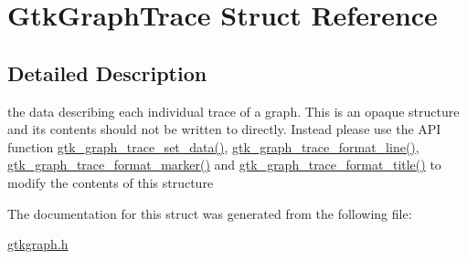\hypertarget{struct_gtk_graph_trace}{
\section{GtkGraphTrace Struct Reference}
\label{struct_gtk_graph_trace}
}


\subsection{Detailed Description}
the data describing each individual trace of a graph. This is an opaque structure and its contents should not be written to directly. Instead please use the API function \hyperlink{gtkgraph_8h_a56bdaf9c2c4612d33a57ca1af2e151c9}{gtk\_\-graph\_\-trace\_\-set\_\-data()}, \hyperlink{gtkgraph_8h_a0006dc30b139c49bfe454eee512c0754}{gtk\_\-graph\_\-trace\_\-format\_\-line()}, \hyperlink{gtkgraph_8h_a6d76b02b2e2db42af55cd3dd8a3df357}{gtk\_\-graph\_\-trace\_\-format\_\-marker()} and \hyperlink{gtkgraph_8h_ad81fd5d72e63d30a708d05707a657996}{gtk\_\-graph\_\-trace\_\-format\_\-title()} to modify the contents of this structure 

The documentation for this struct was generated from the following file:\begin{DoxyCompactItemize}
\item 
\hyperlink{gtkgraph_8h}{gtkgraph.h}\end{DoxyCompactItemize}
